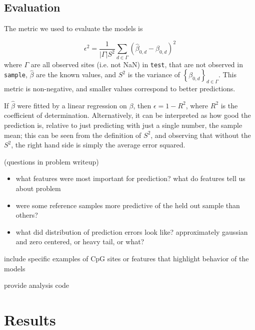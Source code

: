 \documentclass{article} %
\begin{document}
\subsection{Evaluation}

The metric we used to evaluate the models is 

\begin{equation} \label{metric}
\epsilon^2 = \frac{ 1}{|\Gamma| S^{2}} \sum_{d \in \Gamma} \left( \hat{\beta}_{0,d} -  \beta_{0,d}\right)^2 
\end{equation}
where $\Gamma$ are all observed sites (i.e. not NaN) in \texttt{test}, that are not observed in \texttt{sample}, $\hat{\beta}$ are the known values, and $S^2$ is the variance of $\left\{\beta_{0,d}\right\}_{d \in \Gamma}$. This metric is non-negative, and smaller values correspond to better predictions.

If $\hat{\beta}$ were fitted by a linear regression on $\beta$, then $\epsilon = 1 - R^2$, where $R^2$ is the coefficient of determination. Alternatively, it can be interpreted as how good the prediction is, relative to just predicting with just a single number, the sample mean; this can be seen from the definition of $S^2$, and observing that without the $S^2$, the right hand side is simply the average error squared.

(questions in problem writeup)
\begin{itemize}
\item what features were most important for prediction? what do features tell us about problem
\item were some reference samples more predictive of the held out sample than others?
\item what did distribution of prediction errors look like? approximately gaussian and zero centered, or heavy tail, or what?
\end{itemize}

include specific examples of CpG sites or features that highlight behavior of the models

provide analysis code

\section{Results}
\end{document}
